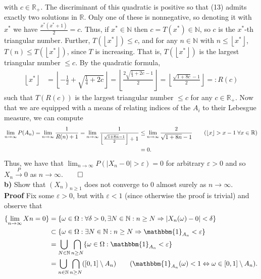 \documentclass[10pt]{article}
\newcommand{\mbb}[1]{\mathbb{#1}}
\newcommand{\1}[1]{\mathbbm{1}_{#1}}
\newcommand*{\floor}[1]{\left\lfloor#1\right\rfloor}
\begin{document}
    with $c\in\mbb{R}_+$. The discriminant of this quadratic is positive so that (13) admits exactly two solutions in $\mbb{R}$. Only one of these is nonnegative, so denoting it with $x^\ast$ we have $\frac{x^\ast(x^\ast+1)}{2}=c$. Thus, if $x^\ast\in\mbb{N}$ then $c=T(x^\ast)\in\mbb{N}$, so $c$ is the $x^\ast$-th triangular number.
    Further, $T(\floor{x^\ast})\leq c$, and for any $n\in\mbb{N}$ with $n\leq\floor{x^\ast}$, $T(n)\leq T(\floor{x^\ast})$, since $T$ is increasing. That is, $T(\floor{x^\ast})$ is the largest triangular number $\leq c$. By the quadratic formula,
    \begin{align*}
        \floor{x^\ast}&=\floor{-\frac{1}{2}+\sqrt{\tfrac{1}{4}+2c}}=\floor{\frac{2\sqrt{\tfrac{1}{4}+2c}-1}{2}}=\floor{\frac{\sqrt{1+8c}-1}{2}}=:R(c)
    \end{align*}
    such that $T(R(c))$ is the largest triangular number $\leq c$ for any $c\in\mbb{R}_+$. Now that we are equipped with a means of relating indices of the $A_i$ to their Lebesgue measure, we can compute
    \begin{align*}
        \lim_{n\rightarrow\infty}P(A_n)=\lim_{n\rightarrow\infty}\frac{1}{R(n)+1}=\lim_{n\rightarrow\infty}\frac{1}{\floor{\frac{\sqrt{1+8n}-1}{2}}+1}&\leq\lim_{n\rightarrow\infty}\frac{2}{\sqrt{1+8n}-1}\tag{$\floor{x}>x-1\;\forall x\in\mbb{R}$}\\
        &=0.
    \end{align*}
    Thus, we have that $\lim_{n\rightarrow\infty}P(|X_n-0|>\varepsilon)=0$ for arbitrary $\varepsilon>0$ and so $X_n\overset{P}{\longrightarrow} 0$ as $n\rightarrow\infty$.\hfill{$\qed$}\\[5pt]
    {\bf b)} Show that $(X_n)_{n\geq 1}$ does not converge to $0$ almost surely as $n\rightarrow\infty$.\\[5pt]
    {\bf Proof}\hspace{5pt} Fix some $\varepsilon>0$, but with $\varepsilon<1$ (since otherwise the proof is trivial) and observe that 
    \begin{align*}
        \{\lim_{n\rightarrow\infty}Xn=0\}&=\{\omega\in\Omega:\forall\delta>0,\exists N\in\mbb{N}:n\geq N\Rightarrow |X_n(\omega)-0|<\delta\}\\
        &\subset\{\omega\in\Omega:\exists N\in\mbb{N}:n\geq N\Rightarrow\1{A_n}<\varepsilon\}\\
        &=\bigcup_{N\in\mbb{N}}\bigcap_{n\geq N}\{\omega\in\Omega:\1{A_n}<\varepsilon\}\\
        &=\bigcup_{n\in\mbb{N}}\bigcap_{n\geq N}([0,1]\setminus A_n)\tag{$\1{A_n}(\omega)<1\Leftrightarrow \omega\in[0,1]\setminus A_n$}.
    \end{align*}
\end{document}
